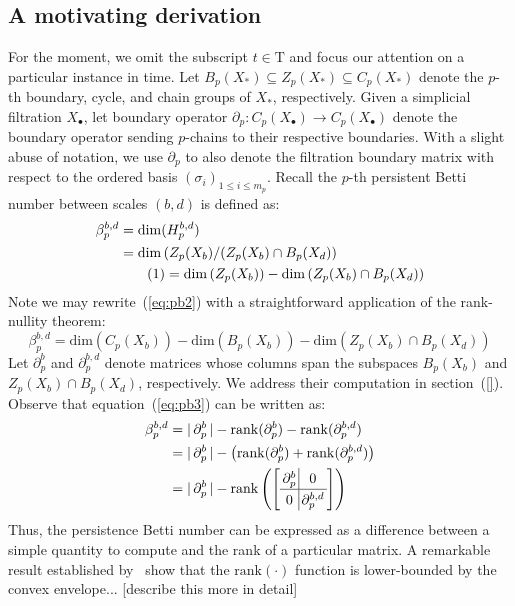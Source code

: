 \documentclass[10pt]{article}
\let\oldref\ref
\renewcommand{\ref}[1]{(\oldref{#1})}
\newcommand\numberthis{\addtocounter{equation}{1}\tag{\theequation}}
\begin{document}
\subsection*{A motivating derivation}
For the moment, we omit the subscript $t \in \mathrm{T}$ and focus our attention on a particular instance in time. Let $B_p(X_\ast) \subseteq Z_p(X_\ast) \subseteq C_p(X_\ast)$ denote the $p$-th boundary, cycle, and chain groups of $X_\ast$, respectively. 
Given a simplicial filtration $X_{\bullet}$, let boundary operator $\partial_p : C_p( X_{\bullet}) \to C_p(X_{\bullet})$ denote the boundary operator sending $p$-chains to their respective boundaries. 
With a slight abuse of notation, we use $\partial_p$ to also denote the filtration boundary matrix with respect to the ordered basis $(\sigma_i)_{1 \leq i \leq m_p}$.  
Recall the $p$-th persistent Betti number between scales $(b,d)$ is defined as: 
\begin{align*}
	\beta_p^{b,d} &= \mathrm{dim}(H_p^{b,d}) \\
	&= \mathrm{dim} \left( Z_p(X_b) / (Z_p(X_b) \cap B_p(X_d) \right) \\
	& \numberthis = \mathrm{dim} \left( Z_p(X_b) \right) - \mathrm{dim}\left( Z_p(X_b) \cap B_p(X_d) \right ) \label{eq:pb2}
\end{align*}
Note we may rewrite~\ref{eq:pb2} with a straightforward application of the rank-nullity theorem:
\begin{equation} \label{eq:pb3}
\beta_p^{b,d} = \mathrm{dim} \left( C_p(X_b) \right) - \mathrm{dim} \left( B_p(X_b) \right) - \mathrm{dim}\left( Z_p(X_b) \cap B_p(X_d) \right )  
\end{equation}
Let $\partial_p^{b}$ and $\partial_p^{b, d}$ denote matrices whose columns span the subspaces $B_p(X_b)$ and $Z_p(X_b) \cap B_p(X_d)$, respectively. We address their computation in section~\ref{}. Observe that equation~\ref{eq:pb3} can be written as: 
\begin{align}
	\beta_p^{b,d} &= \lvert \, \partial_p^b \, \rvert - \mathrm{rank}(\partial_p^b) - \mathrm{rank}(\partial_p^{b,d}) \\
	&= \lvert \, \partial_p^b \, \rvert - \left( \mathrm{rank}(\partial_p^b) + \mathrm{rank}(\partial_p^{b,d}) \right) \\
	&=
	\lvert \, \partial_p^b \, \rvert - 
	\arraycolsep=1.8pt\def\arraystretch{1.25}
	\mathrm{rank}\left(\left[\begin{array}{c|c}
 		\partial_p^{b} & 0 \\
		\hline
		0 & \partial_p^{b,d}
	\end{array}\right] \right) \label{eq:block_pb}
\end{align}
Thus, the persistence Betti number can be expressed as a difference between a simple quantity to compute and the rank of a particular matrix. A remarkable result established by~\cite{} show that the $\mathrm{rank}(\cdot)$ function is lower-bounded by the convex envelope... [describe this more in detail]
\end{document}
